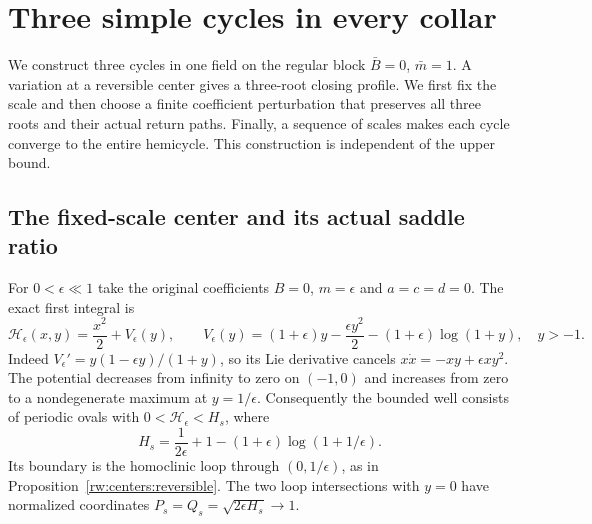 \section{Three simple cycles in every collar}\label{rw:lower-bound-section}

We construct three cycles in one field on the regular block
$\bar B=0$, $\bar m=1$. A variation at a reversible center gives a
three-root closing profile. We first fix the scale and then choose a
finite coefficient perturbation that preserves all three roots and
their actual return paths. Finally, a sequence of scales makes each
cycle converge to the entire hemicycle. This construction is independent
of the upper bound.

\subsection{The fixed-scale center and its actual saddle ratio}

For $0<\epsilon\ll1$ take the original coefficients
$B=0$, $m=\epsilon$ and $a=c=d=0$. The exact first integral is
\begin{equation}\label{rw:lower:center-energy}
 \mathscr H_\epsilon(x,y)=\frac{x^2}{2}+V_\epsilon(y),\qquad
 V_\epsilon(y)=(1+\epsilon)y-\frac{\epsilon y^2}{2}
                    -(1+\epsilon)\log(1+y),\quad y>-1.
\end{equation}
Indeed $V_\epsilon'=y(1-\epsilon y)/(1+y)$, so its Lie derivative
cancels $x\dot x=-xy+\epsilon xy^2$.
The potential decreases from infinity to zero on $(-1,0)$ and
increases from zero to a nondegenerate maximum at $y=1/\epsilon$.
Consequently the bounded well consists of periodic ovals with
$0<\mathscr H_\epsilon<H_s$, where
\begin{equation}\label{rw:lower:saddle-energy}
 H_s=\frac1{2\epsilon}+1
                  -(1+\epsilon)\log(1+1/\epsilon).
\end{equation}
Its boundary is the homoclinic loop through $(0,1/\epsilon)$,
as in Proposition~\ref{rw:centers:reversible}.
The two loop intersections with $y=0$ have normalized coordinates
$P_s=Q_s=\sqrt{2\epsilon H_s}\to1$.

